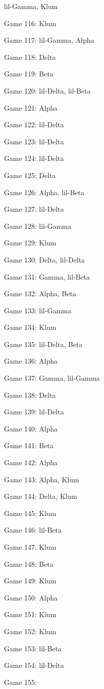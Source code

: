 \documentclass{article}
\begin{document}
\begin{multicols}{3}
\begin{compactitem}
lil-Gamma, Klum
\item Game 116:
Klum
\item Game 117:
lil-Gamma, Alpha
\item Game 118:
Delta
\item Game 119:
Beta
\item Game 120:
lil-Delta, lil-Beta
\item Game 121:
Alpha
\item Game 122:
lil-Delta
\item Game 123:
lil-Delta
\item Game 124:
lil-Delta
\item Game 125:
Delta
\item Game 126:
Alpha, lil-Beta
\item Game 127:
lil-Delta
\item Game 128:
lil-Gamma
\item Game 129:
Klum
\item Game 130:
Delta, lil-Delta
\item Game 131:
Gamma, lil-Beta
\item Game 132:
Alpha, Beta
\item Game 133:
lil-Gamma
\item Game 134:
Klum
\item Game 135:
lil-Delta, Beta
\item Game 136:
Alpha
\item Game 137:
Gamma, lil-Gamma
\item Game 138:
Delta
\item Game 139:
lil-Delta
\item Game 140:
Alpha
\item Game 141:
Beta
\item Game 142:
Alpha
\item Game 143:
Alpha, Klum
\item Game 144:
Delta, Klum
\item Game 145:
Klum
\item Game 146:
lil-Beta
\item Game 147:
Klum
\item Game 148:
Beta
\item Game 149:
Klum
\item Game 150:
Alpha
\item Game 151:
Klum
\item Game 152:
Klum
\item Game 153:
lil-Beta
\item Game 154:
lil-Delta
\item Game 155:

\end{compactitem}
\end{multicols}
\end{document}

